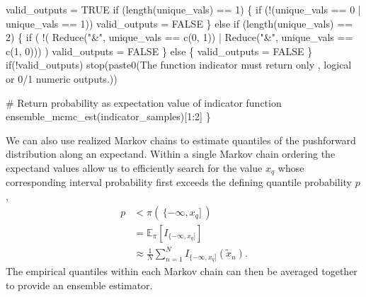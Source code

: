 \documentclass[
  letterpaper,
  DIV=11,
  numbers=noendperiod]{scrartcl}
\newenvironment{Shaded}{\begin{snugshade}}{\end{snugshade}}
\newcommand{\CommentTok}[1]{\textcolor[rgb]{0.37,0.37,0.37}{#1}}
\newcommand{\ControlFlowTok}[1]{\textcolor[rgb]{0.00,0.23,0.31}{#1}}
\newcommand{\DecValTok}[1]{\textcolor[rgb]{0.68,0.00,0.00}{#1}}
\newcommand{\NormalTok}[1]{\textcolor[rgb]{0.00,0.23,0.31}{#1}}
\newcommand{\OperatorTok}[1]{\textcolor[rgb]{0.37,0.37,0.37}{#1}}
\newcommand{\StringTok}[1]{\textcolor[rgb]{0.13,0.47,0.30}{#1}}
\begin{document}
\begin{Shaded}
\begin{Highlighting}[]
\NormalTok{  valid\_outputs }\OperatorTok{=}\NormalTok{ TRUE}
  \ControlFlowTok{if}\NormalTok{ (length(unique\_vals) }\OperatorTok{==} \DecValTok{1}\NormalTok{) \{}
    \ControlFlowTok{if}\NormalTok{ (}\OperatorTok{!}\NormalTok{(unique\_vals }\OperatorTok{==} \DecValTok{0} \OperatorTok{|}\NormalTok{ unique\_vals }\OperatorTok{==} \DecValTok{1}\NormalTok{))}
\NormalTok{      valid\_outputs }\OperatorTok{=}\NormalTok{ FALSE}
\NormalTok{  \} }\ControlFlowTok{else} \ControlFlowTok{if}\NormalTok{ (length(unique\_vals) }\OperatorTok{==} \DecValTok{2}\NormalTok{) \{}
    \ControlFlowTok{if}\NormalTok{ ( }\OperatorTok{!}\NormalTok{(  Reduce(}\StringTok{"\&"}\NormalTok{, unique\_vals }\OperatorTok{==}\NormalTok{ c(}\DecValTok{0}\NormalTok{, }\DecValTok{1}\NormalTok{))}
           \OperatorTok{|}\NormalTok{ Reduce(}\StringTok{"\&"}\NormalTok{, unique\_vals }\OperatorTok{==}\NormalTok{ c(}\DecValTok{1}\NormalTok{, }\DecValTok{0}\NormalTok{))) )}
\NormalTok{      valid\_outputs }\OperatorTok{=}\NormalTok{ FALSE}
\NormalTok{  \} }\ControlFlowTok{else}\NormalTok{ \{}
\NormalTok{    valid\_outputs }\OperatorTok{=}\NormalTok{ FALSE}
\NormalTok{  \}}
  \ControlFlowTok{if}\NormalTok{(}\OperatorTok{!}\NormalTok{valid\_outputs)}
\NormalTok{    stop(paste0(}\StringTok{\textquotesingle{}The function \textasciigrave{}indicator\textasciigrave{} must return only \textquotesingle{}}\NormalTok{,}
                \StringTok{\textquotesingle{}logical or 0/1 numeric outputs.\textquotesingle{}}\NormalTok{))}

  \CommentTok{\# Return probability as expectation value of indicator function}
\NormalTok{  ensemble\_mcmc\_est(indicator\_samples)[}\DecValTok{1}\NormalTok{:}\DecValTok{2}\NormalTok{]}
\NormalTok{\}}
\end{Highlighting}
\end{Shaded}

We can also use realized Markov chains to estimate quantiles of the
pushforward distribution along an expectand. Within a single Markov
chain ordering the expectand values allow us to efficiently search for
the value \(x_{q}\) whose corresponding interval probability first
exceeds the defining quantile probability \(p\), \begin{align*}
p
&<
\pi( \, \{ -\infty, x_{q} ] \, )
\\
&=
\mathbb{E}_{\pi} \left[ I_{ \{ -\infty, x_{q} ] } \right]
\\
&\approx
\frac{1}{N} \sum_{n = 1}^{N} I_{ \{ -\infty,  x_{q} ] }( \tilde{x}_{n}).
\end{align*} The empirical quantiles within each Markov chain can then
be averaged together to provide an ensemble estimator.
\end{document}
